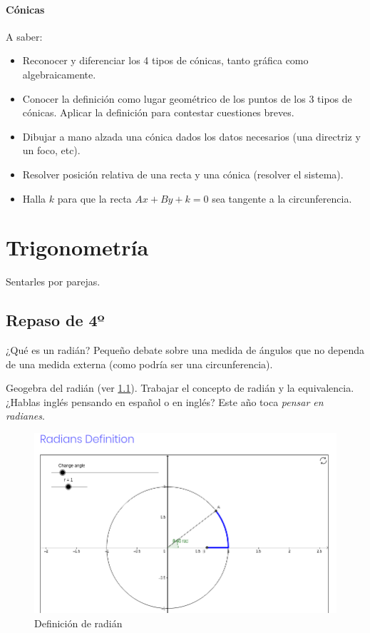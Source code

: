 \documentclass[palatino,nosec]{Docencia}
\begin{document}
\subsubsection{Cónicas}
A saber:
\begin{itemize}
	\item Reconocer y diferenciar los 4 tipos de cónicas, tanto gráfica como algebraicamente.
	\item Conocer la definición como lugar geométrico de los puntos de los 3 tipos de cónicas.
	\subitem Aplicar la definición para contestar cuestiones breves.
	\item Dibujar a mano alzada una cónica dados los datos necesarios (una directriz y un foco, etc).
	\item Resolver posición relativa de una recta y una cónica (resolver el sistema).
	\item Halla $k$ para que la recta $Ax+By+k=0$ sea tangente a la circunferencia.

\end{itemize}

\chapter{Trigonometría}

Sentarles por parejas.

\section{Repaso de 4º}

¿Qué es un radián? Pequeño debate sobre una medida de ángulos que no dependa de una medida externa (como podría ser una circunferencia).

Geogebra del radián (ver \ref{img:radian}). Trabajar el concepto de radián y la equivalencia. ¿Hablas inglés pensando en español o en inglés? Este año toca \textit{pensar en radianes}.

\begin{figure}
\centering
\includegraphics[scale=0.5]{img/Trigon1}
\caption{Definición de radián}
\label{img:radian}
\end{figure}
\end{document}
